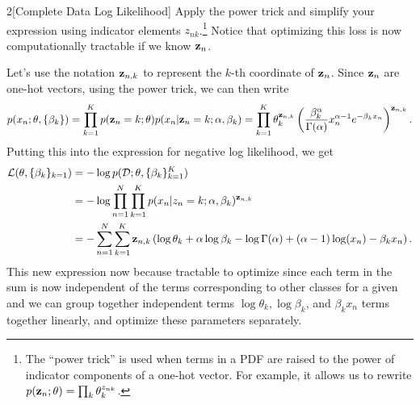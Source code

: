 \documentclass[expanded]{lkx_pset}
\begin{document}
\begin{solution}
\begin{part}{2}[Complete Data Log Likelihood]
		Apply the power trick and simplify your expression using indicator elements $z_{n
					k}$.\footnote{The ``power trick'' is used when terms in a PDF are raised to the power of indicator components of a one-hot vector.  For example, it allows us to rewrite $p(\mathbf{z}_n ;  \mathbf{\theta}) = \prod_k \theta_k^{z_{nk}}$.} Notice that optimizing this loss is now computationally tractable if we know $\mathbf{z}_n$.
	\end{part}

	Let's use the notation $\mathbf{z}_{n,k}$ to represent the $k$-th coordinate of $\mathbf{z}_n$. Since $\mathbf{z}_n$ are one-hot vectors, using the power trick, we can then write
	\[
		p(x_n; \theta, \{\beta_k\}) = \prod_{k=1}^K p(\mathbf{z}_n=k; \theta) p(x_n | \mathbf{z}_n=k; \alpha, \beta_k) = \prod_{k=1}^K\theta_k^{\mathbf{z}_{n,k}}\left(\frac{\beta_k^\alpha}{\Gamma(\alpha)}x^{\alpha-1}_n e^{-\beta_k x_n}\right)^{\mathbf{z}_{n,k}}.
	\]
	Putting this into the expression for negative log likelihood, we get
	\[
		\begin{aligned}
			\mathcal{L}(\theta, \{\beta_k\}_{k=1})
			 & = -\log p(\mathcal{D}; \theta, \{\beta_k\}_{k=1}^K)                                                                                             \\
			 & = -\log \prod^N_{n=1}\prod_{k=1}^K p(x_n | z_n = k; \alpha,\beta_k)^{\mathbf{z}_{n,k}}                                                              \\
			 & = -\sum^N_{n=1}\sum^K_{k=1} \mathbf{z}_{n,k}\left(\log \theta_k + \alpha\log\beta_k - \log\Gamma(\alpha)+ (\alpha-1)\log(x_n) - \beta_k x_n\right).
		\end{aligned}
	\]
	This new expression now because tractable to optimize since each term in the sum is now independent of the terms corresponding to other classes for a given and we can group together independent terms $\log \theta_k, \log \beta_k$, and $\beta_k x_n$ terms together linearly, and optimize these parameters separately.


\end{solution}
\end{document}

